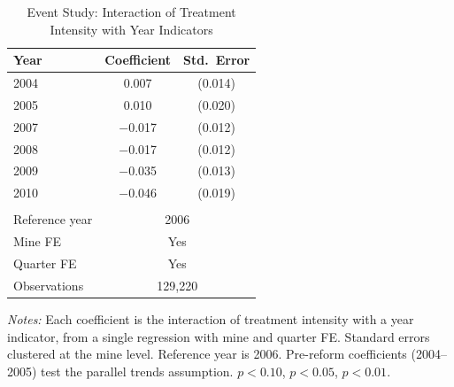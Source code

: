 \begin{table}[H]
\centering
\caption{Event Study: Interaction of Treatment Intensity with Year Indicators}
\label{tab:eventstudy}
\begin{tabular}{lcc}
\toprule
Year & Coefficient & Std.\ Error \\
\midrule
2004 & 0.007 & (0.014) \\
2005 & 0.010 & (0.020) \\
2007 & $-$0.017 & (0.012) \\
2008 & $-$0.017 & (0.012) \\
2009 & $-$0.035\sym{***} & (0.013) \\
2010 & $-$0.046\sym{**} & (0.019) \\
\\
Reference year & \multicolumn{2}{c}{2006} \\
Mine FE & \multicolumn{2}{c}{Yes} \\
Quarter FE & \multicolumn{2}{c}{Yes} \\
Observations & \multicolumn{2}{c}{129,220} \\
\bottomrule
\end{tabular}
\par\vspace{0.3em}
{\footnotesize \textit{Notes:} Each coefficient is the interaction of treatment intensity with a year indicator, from a single regression with mine and quarter FE. Standard errors clustered at the mine level. Reference year is 2006. Pre-reform coefficients (2004--2005) test the parallel trends assumption. \sym{*} $p<0.10$, \sym{**} $p<0.05$, \sym{***} $p<0.01$.}
\end{table}
